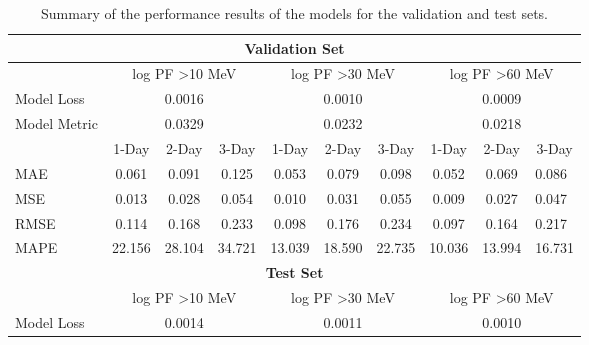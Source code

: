 \begin{table}[!htp]
\centering
\caption{Summary of the performance results of the models for the validation and test sets.}
\begin{tabular}{lccccccccl}
\hline
\multicolumn{10}{c}{\textbf{Validation Set}}                                                                                                                 \\ \hline
       & \multicolumn{3}{c}{log PF \textgreater{}10 MeV} & \multicolumn{3}{c}{log PF \textgreater{}30 MeV} & \multicolumn{3}{c}{log PF \textgreater{}60 MeV} \\ \hline
Model Loss   & \multicolumn{3}{c}{0.0016}                      & \multicolumn{3}{c}{0.0010}                      & \multicolumn{3}{c}{0.0009}                      \\
Model Metric & \multicolumn{3}{c}{0.0329}                      & \multicolumn{3}{c}{0.0232}                      & \multicolumn{3}{c}{0.0218}                      \\ \hline
       & 1-Day          & 2-Day          & 3-Day         & 1-Day          & 2-Day          & 3-Day         & 1-Day    & 2-Day   & \multicolumn{1}{c}{3-Day}  \\ \hline
MAE    & 0.061          & 0.091          & 0.125         & 0.053          & 0.079          & 0.098         & 0.052    & 0.069   & 0.086                      \\
MSE    & 0.013          & 0.028          & 0.054         & 0.010          & 0.031          & 0.055         & 0.009    & 0.027   & 0.047                      \\
RMSE   & 0.114          & 0.168          & 0.233         & 0.098          & 0.176          & 0.234         & 0.097    & 0.164   & 0.217                      \\
MAPE   & 22.156         & 28.104         & 34.721        & 13.039         & 18.590         & 22.735        & 10.036   & 13.994  & 16.731                     \\ \hline
\multicolumn{10}{c}{\textbf{Test Set}}                                                                                                                       \\ \hline
       & \multicolumn{3}{c}{log PF \textgreater{}10 MeV} & \multicolumn{3}{c}{log PF \textgreater{}30 MeV} & \multicolumn{3}{c}{log PF \textgreater{}60 MeV} \\ \hline
Model Loss   & \multicolumn{3}{c}{0.0014}                      & \multicolumn{3}{c}{0.0011}                      & \multicolumn{3}{c}{0.0010}                      \\

\end{tabular}
\end{table}
